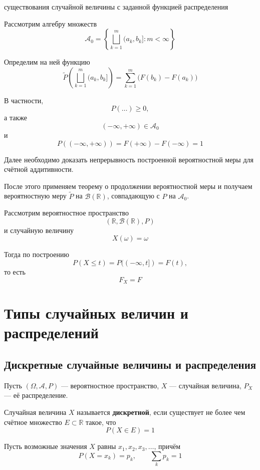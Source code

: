 \documentclass[12pt,a4paper]{article}
\begin{document}
\begin{proofbox}{существования случайной величины с заданной функцией распределения}

Рассмотрим алгебру множеств
\[
\mathcal{A}_0
=
\left\{
\bigsqcup_{k=1}^{m}(a_k,b_k]:
m<\infty
\right\}
\]

Определим на ней функцию
\[
\widetilde{P}
\left(
\bigsqcup_{k=1}^{m}(a_k,b_k]
\right)
=
\sum_{k=1}^{m}
\bigl(F(b_k)-F(a_k)\bigr)
\]

В частности,
\[
P(\ldots)\geq0,
\]
а также
\[
(-\infty,+\infty)\in\mathcal{A}_0
\]
и
\[
P((-\infty,+\infty))
=
F(+\infty)-F(-\infty)
=
1
\]

Далее необходимо доказать непрерывность построенной вероятностной меры для счётной аддитивности.

После этого применяем теорему о продолжении вероятностной меры и получаем вероятностную меру $\widetilde{P}$ на $\mathcal{B}(\mathbb{R})$, совпадающую с $P$ на $\mathcal{A}_0$.

Рассмотрим вероятностное пространство
\[
(\mathbb{R},\mathcal{B}(\mathbb{R}),P)
\]
и случайную величину
\[
X(\omega)=\omega
\]

Тогда по построению
\[
P(X\leq t)=P((-\infty,t])=F(t),
\]
то есть
\[
F_X=F
\]

\end{proofbox}

\newpage

\section{Типы случайных величин и распределений}

\subsection{Дискретные случайные величины и распределения}

Пусть $(\Omega,\mathcal{A},P)$ --- вероятностное пространство, $X$ --- случайная величина, $P_X$ --- её распределение.

\begin{definition}

Случайная величина $X$ называется \textbf{дискретной}, если существует не более чем счётное множество $E\subset\mathbb{R}$ такое, что
\[
P(X\in E)=1
\]

\end{definition}

Пусть возможные значения $X$ равны $x_1,x_2,x_3,\ldots$, причём
\[
P(X=x_k)=p_k,
\qquad
\sum_k p_k=1
\]
\end{document}
